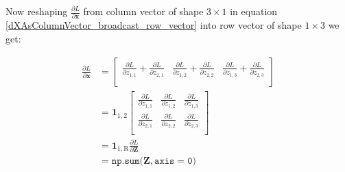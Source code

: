 \documentclass{article}
\newcommand{\vecr}[1]{\bm{#1}}
\newcommand{\matr}[1]{\mathbf{#1}} %
\begin{document}
Now reshaping $\frac{\partial L}{\partial \vecr{x}}$ from column vector of shape $3 \times 1$ in equation \ref{dXAsColumnVector_broadcast_row_vector} into row vector of shape $1 \times 3$ we get:

\begin{align}
\frac{\partial L}{\partial \vecr{x}} &=
\begin{bmatrix}
\frac{\partial L}{\partial z_{1,1}} +
\frac{\partial L}{\partial z_{2,1}} &
\frac{\partial L}{\partial z_{1,2}} +
\frac{\partial L}{\partial z_{2,2}} &
\frac{\partial L}{\partial z_{1,3}} +
\frac{\partial L}{\partial z_{2,3}} \\[0.7em]
\end{bmatrix}
\nonumber \\
&=
\mathbf{1}_{1, \text{2}}
\begin{bmatrix}
\frac{\partial L}{\partial z_{1,1}} & \frac{\partial L}{\partial z_{1,2}} & \frac{\partial L}{\partial z_{1,3}}\\[0.7em]
\frac{\partial L}{\partial z_{2,1}} & \frac{\partial L}{\partial z_{2,2}} & \frac{\partial L}{\partial z_{2,3}}\\[0.7em]
\end{bmatrix}
\nonumber \\
&=
\mathbf{1}_{1, \text{R}} \frac{\partial L}{\partial \matr{Z}}
\nonumber \\
&=
\mathtt{np.sum(} \matr{Z} \mathtt{, axis=0)}
\end{align}
\end{document}
